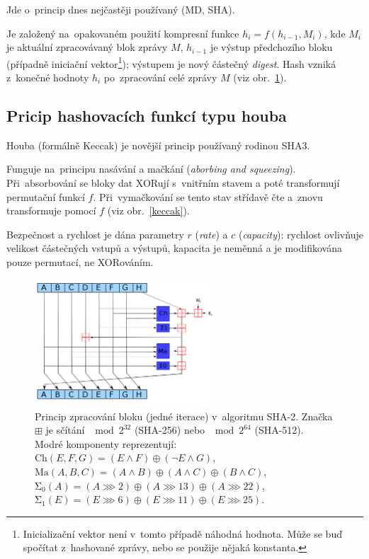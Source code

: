 Jde o~princip dnes nejčastěji používaný (MD, SHA).

Je založený na~opakovaném použití kompresní funkce $h_i = f(h_{i-1}, M_i)$, kde
$M_i$ je aktuální zpracovávaný blok zprávy $M$,
$h_{i-1}$ je výstup předchozího bloku (případně iniciační vektor\footnote{
    Inicializační vektor není v~tomto případě náhodná hodnota.
    Může se buď spočítat z~hashované zprávy, nebo se použije nějaká konstanta.
});
výstupem je nový částečný \emph{digest}.
Hash vzniká z~konečné hodnoty $h_i$ po~zpracování celé zprávy $M$ (viz obr.~\ref{sha}).


\subsection{Pricip hashovacích funkcí typu houba}

Houba (formálně Keccak) je novější princip používaný rodinou SHA3.

Funguje na~principu nasávání a mačkání (\emph{aborbing and squeezing}).
Při~absorbování se bloky dat XORují s~vnitřním stavem a poté transformují permutační funkcí $f$.
Při~vymačkování se tento stav střídavě čte a~znovu transformuje pomocí $f$ (viz obr.~\ref{keccak}).

Bezpečnost a rychlost je dána parametry $r$ (\emph{rate}) a $c$ (\emph{capacity}): rychlost ovlivňuje velikost částečných vstupů a výstupů, kapacita je neměnná a je modifikována pouze permutací, ne XORováním.

\begin{figure}
    \centering
    \includegraphics[width=0.6\textwidth]{img/sha-construction}
    \caption{
        Princip zpracování bloku (jedné iterace) v~algoritmu SHA-2.
        Značka $\boxplus$ je sčítání $\mod 2^{32}$ (SHA-256) nebo $\mod 2^{64}$ (SHA-512).
        Modré komponenty reprezentují:
        \\
        $\mathrm{Ch}(E,F,G) = (E \wedge F) \oplus (\neg E \wedge G)$, \\
        $\mathrm{Ma}(A,B,C) = (A \wedge B) \oplus (A \wedge C) \oplus (B \wedge C)$, \\
        $\mathrm{\Sigma_0}(A) = (A \ggg 2) \oplus (A \ggg 13) \oplus (A \ggg 22)$, \\
        $\mathrm{\Sigma_1}(E) = (E \ggg 6) \oplus (E \ggg 11) \oplus (E \ggg 25)$.
        }
    \label{sha}
\end{figure}


